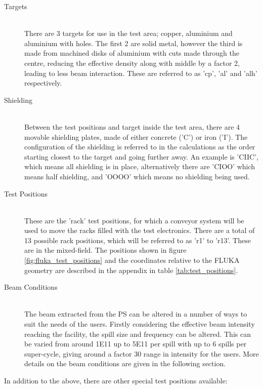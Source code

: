 \begin{description}
\item[Targets] \hfill \\
There are 3 targets for use in the test area; copper, aluminium and aluminium with holes. The first 2 are solid metal, however the third is made from machined disks of aluminium with cuts made through the centre, reducing the effective density along with middle by a factor 2, leading to less beam interaction. These are referred to as 'cp', 'al' and 'alh' respectively.

\item[Shielding] \hfill \\
Between the test positions and target inside the test area, there are 4 movable shielding plates, made of either concrete ('C') or iron ('I'). The configuration of the shielding is referred to in the calculations as the order starting closest to the target and going further away. An example is 'CIIC', which means all shielding is in place, alternatively there are 'CIOO' which means half shielding, and 'OOOO' which means no shielding being used. 

\item[Test Positions] \hfill \\
These are the 'rack' test positions, for which a conveyor system will be used to move the racks filled with the test electronics. There are a total of 13 possible rack positions, which will be referred to as 'r1' to 'r13'. These are in the mixed-field. The positions shown in figure \ref{fig:fluka_test_positions} and the coordinates relative to the FLUKA geometry are described in the appendix in table \ref{tab:test_positions}.

\item[Beam Conditions] \hfill \\
The beam extracted from the PS can be altered in a number of ways to suit the needs of the users. Firstly considering the effective beam intensity reaching the facility, the spill size and frequency can be altered. This can be varied from around 1E11 up to 5E11 per spill with up to 6 spills per super-cycle, giving around a factor 30 range in intensity for the users. More details on the beam conditions are given in the following section. \\
\end{description}

\noindent In addition to the above, there are other special test positions available: \\


